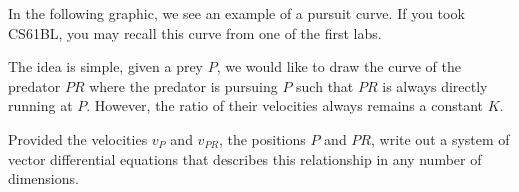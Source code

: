 

\iffalse
This problem was created as a neat application of differential equations and linearization.
\fi


In the following graphic, we see an example of a pursuit curve.
If you took CS61BL, you may recall this curve from one of the first labs.

\begin{center}
\end{center}

The idea is simple, given a prey $P$, we would like to draw the curve of the predator $PR$ where the predator is pursuing $P$ such that $PR$ is always directly running at $P$.
However, the ratio of their velocities always remains a constant $K$.

\qitem Provided the velocities $v_{P}$ and $v_{PR}$, the positions $P$ and $PR$, write out a system of vector differential equations that describes this relationship in any number of dimensions.

\sol{
}
